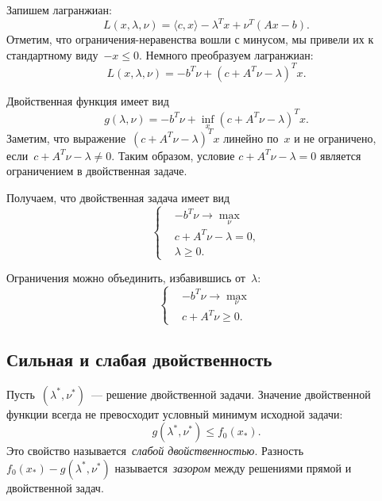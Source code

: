 \documentclass[12pt,fleqn]{article}
\begin{document}
\begin{esSolution}
    Запишем лагранжиан:
    \[
        L(x, \lambda, \nu)
        =
        \langle c, x \rangle
        -
        \lambda^T x
        +
        \nu^T (Ax - b).
    \]
    Отметим, что ограничения-неравенства вошли с минусом,
    мы привели их к стандартному виду~$-x \leq 0$.
    Немного преобразуем лагранжиан:
    \[
        L(x, \lambda, \nu)
        =
        -b^T \nu
        +
        (c + A^T \nu - \lambda)^T x.
    \]

    Двойственная функция имеет вид
    \[
        g(\lambda, \nu)
        =
        -b^T \nu
        +
        \inf_x (c + A^T \nu - \lambda)^T x.
    \]
    Заметим, что выражение~$(c + A^T \nu - \lambda)^T x$
    линейно по~$x$ и не ограничено, если~$c + A^T \nu - \lambda \neq 0$.
    Таким образом, условие $c + A^T \nu - \lambda = 0$ является ограничением
    в двойственная задаче.

    Получаем, что двойственная задача имеет вид
    \[
        \left\{
            \begin{aligned}
                & -b^T \nu \to \max_\nu \\
                & c + A^T \nu - \lambda = 0, \\
                & \lambda \geq 0.
            \end{aligned}
        \right.
    \]

    Ограничения можно объединить, избавившись от~$\lambda$:
    \[
        \left\{
            \begin{aligned}
                & -b^T \nu \to \max_\nu \\
                & c + A^T \nu \geq 0.
            \end{aligned}
        \right.
    \]
\end{esSolution}

\subsection{Сильная и слабая двойственность}
Пусть~$(\lambda^*, \nu^*)$~--- решение двойственной задачи.
Значение двойственной функции всегда не превосходит условный
минимум исходной задачи:
\[
    g(\lambda^*, \nu^*)
    \leq
    f_0(x_*).
\]
Это свойство называется~\emph{слабой двойственностью}.
Разность~$f_0(x_*) - g(\lambda^*, \nu^*)$ называется~\emph{зазором}
между решениями прямой и двойственной задач.
\end{document}
